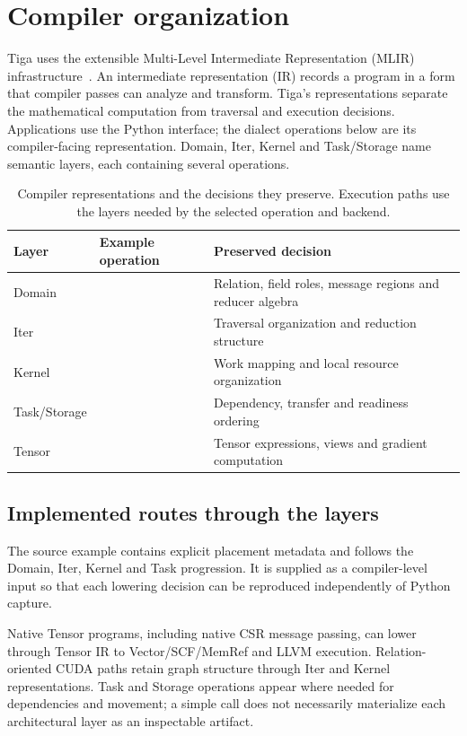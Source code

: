 \section{Compiler organization}
\label{sec:compiler}
Tiga uses the extensible Multi-Level Intermediate Representation (MLIR)
infrastructure~\cite{mlir}. An intermediate representation (IR) records a program
in a form that compiler passes can analyze and transform. Tiga's representations separate
the mathematical computation from traversal and execution decisions.
Applications use the Python interface; the  dialect operations below
are its compiler-facing representation. Domain, Iter, Kernel and Task/Storage
name semantic layers, each containing several operations.

\begin{table}[ht]
\centering\small
\begin{tabularx}{\linewidth}{l l Y}
\toprule
Layer & Example operation & Preserved decision \\
\midrule
Domain &  & Relation, field roles, message regions and reducer algebra \\
Iter &  & Traversal organization and reduction structure \\
Kernel &  & Work mapping and local resource organization \\
Task/Storage &  & Dependency, transfer and readiness ordering \\
Tensor &  & Tensor expressions, views and gradient computation \\
\bottomrule
\end{tabularx}
\caption{Compiler representations and the decisions they preserve. Execution
paths use the layers needed by the selected operation and backend.}
\end{table}



\subsection{Implemented routes through the layers}
The source example  contains explicit
placement metadata and follows the Domain, Iter, Kernel and Task progression.
It is supplied as a compiler-level input so that each lowering decision can be
reproduced independently of Python capture.

Native Tensor programs, including native CSR message passing, can lower through
Tensor IR to Vector/SCF/MemRef and LLVM execution. Relation-oriented CUDA paths
retain graph structure through Iter and Kernel representations. Task and Storage
operations appear where needed for dependencies and movement; a simple call does
not necessarily materialize each architectural layer as an inspectable artifact.

